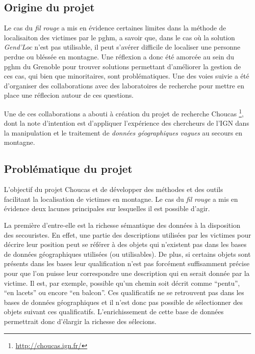 

\subsection{Origine du projet}
\label{subsec:1-2-1}

Le cas du \emph{fil rouge} a mis en évidence certaines limites dans la
méthode de localisaiton des victimes par le \ac{pghm}, a savoir que,
dans le cas où la solution \emph{Gend'Loc} n'est pas utilisable, il
peut s'avérer difficile de localiser une personne perdue ou bléssée en
montagne. Une réflexion a donc été amorcée au sein du \ac{pghm} du
Grenoble pour trouver solutions permettant d'améliorer la gestion de
ces cas, qui bien que minoritaires, sont problématiques. Une des voies
suivie a été d'organiser des collaborations avec des laboratoires de
recherche pour mettre en place une réflecion autour de ces questions.

Une de ces collaborations a abouti à création du projet de recherche
Choucas \footnote{\url{http://choucas.ign.fr/}}, dont la note
d'intention est d'appliquer l'expérience des chercheurs de l'IGN dans
la manipulation et le traitement de \emph{données géographiques
  vagues} au secours en montagne. 

\subsection{Problématique du projet}
\label{subsec:1-2-2}

L'objectif du projet Choucas et de développer des méthodes et des
outils facilitant la localisation de victimes en montagne. Le cas du
\emph{fil rouge} a mis en évidence deux lacunes principales sur
lesquelles il est possible d'agir.

La première d'entre-elle est la richesse sémantique des données à la
disposition des secouristes. En effet, une partie des descriptions
utilisées par les victimes pour décrire leur position peut se référer
à des objets qui n'existent pas dans les bases de données
géographiques utilisées (ou utilisables). De plus, si certains objets
sont présents dans les bases leur qualification n'est pas forcément
suffisamment précise pour que l'on puisse leur correspondre une
description qui en serait donnée par la victime. Il est, par exemple,
possible qu'un chemin soit décrit comme \enquote{pentu}, \enquote{en
  lacets} ou encore \enquote{en balcon}. Ces qualificatifs ne se
retrouvent pas dans les bases de données géographiques et il n'est
donc pas possible de sélectionner des objets suivant ces
qualificatifs. L'enrichissement de cette base de données permettrait
donc d'élargir la richesse des sélecions.

